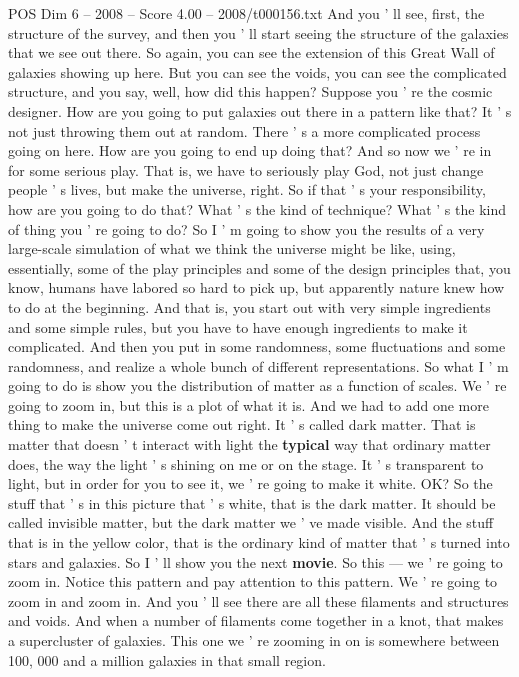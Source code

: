 \begin{textsample}{POS Dim 6 – 2008 – Score 4.00 – 2008/t000156.txt}
And you ' ll see, first, the structure of the survey, and then you ' ll start seeing the structure of the galaxies that we see out there.
So again, you can see the extension of this Great Wall of galaxies showing up here.
But you can see the voids, you can see the complicated structure, and you say, well, how did this happen?
Suppose you ' re the cosmic designer.
How are you going to put galaxies out there in a pattern like that?
It ' s not just throwing them out at random.
There ' s a more complicated process going on here.
How are you going to end up doing that?
And so now we ' re in for some serious play.
That is, we have to seriously play God, not just change people ' s lives, but make the universe, right.
So if that ' s your responsibility, how are you going to do that?
What ' s the kind of technique?
What ' s the kind of thing you ' re going to do?
So I ' m going to show you the results of a very large-scale simulation of what we think the universe might be like, using, essentially, some of the play principles and some of the design principles that, you know, humans have labored so hard to pick up, but apparently nature knew how to do at the beginning.
And that is, you start out with very simple ingredients and some simple rules, but you have to have enough ingredients to make it complicated.
And then you put in some randomness, some fluctuations and some randomness, and realize a whole bunch of different representations.
So what I ' m going to do is show you the distribution of matter as a function of scales.
We ' re going to zoom in, but this is a plot of what it is.
And we had to add one more thing to make the universe come out right.
It ' s called dark matter.
That is matter that doesn ' t interact with light the \textbf{typical} way that ordinary matter does, the way the light ' s shining on me or on the stage.
It ' s transparent to light, but in order for you to see it, we ' re going to make it white.
OK?
So the stuff that ' s in this picture that ' s white, that is the dark matter.
It should be called invisible matter, but the dark matter we ' ve made visible.
And the stuff that is in the yellow color, that is the ordinary kind of matter that ' s turned into stars and galaxies.
So I ' ll show you the next \textbf{movie}.
So this — we ' re going to zoom in.
Notice this pattern and pay attention to this pattern.
We ' re going to zoom in and zoom in.
And you ' ll see there are all these filaments and structures and voids.
And when a number of filaments come together in a knot, that makes a supercluster of galaxies.
This one we ' re zooming in on is somewhere between 100, 000 and a million galaxies in that small region.

\end{textsample}
